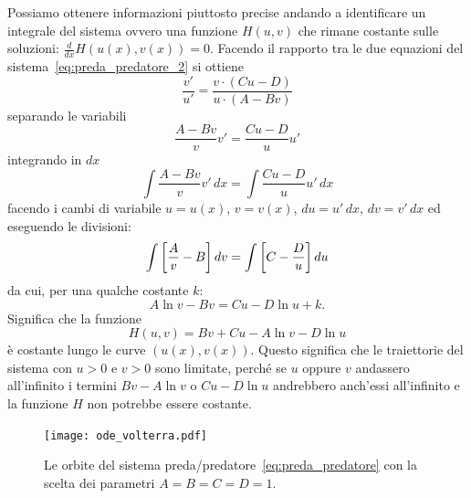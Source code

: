 Possiamo ottenere informazioni piuttosto precise andando a identificare un integrale 
del sistema ovvero una funzione $H(u,v)$ che rimane costante sulle soluzioni: 
$\frac {d}{dx} H(u(x),v(x)) = 0$. 
Facendo il rapporto tra le due equazioni del sistema~\eqref{eq:preda_predatore_2}
si ottiene 
\[
  \frac{v'}{u'} 
  = \frac{v \cdot (C u - D)}{u \cdot (A - B v)}
\]
separando le variabili
\[
  \frac{A - B v}{v} v' = \frac{C u - D}{u} u'
\]
integrando in $dx$
\[
  \int \frac{A - B v}{v} v'\, dx  = \int \frac{C u - D}{u} u'  \, dx
\]
facendo i cambi di variabile $u=u(x)$, $v=v(x)$, $du = u'\, dx$, $dv=v'\, dx$
ed eseguendo le divisioni:
\[     
  \int {\left[ \frac A v - B \right]}\, dv = \int {\left[ C  - \frac D u \right]}\, du
\]
da cui, per una qualche costante $k$:
\[
  A \ln v - B v = C u - D\ln u + k.
\]
Significa che la funzione 
\[
  H(u,v) = B v + C u - A \ln v - D \ln u
\]
è costante lungo le curve $(u(x),v(x))$.
Questo significa che le traiettorie del sistema 
con $u>0$ e $v>0$ sono limitate, perché se 
$u$ oppure $v$ andassero all'infinito 
i termini $Bv-A\ln v$ o $Cu - D \ln u$ andrebbero 
anch'essi all'infinito e la funzione $H$ non 
potrebbe essere costante.

\begin{figure}
  \begin{center}
    \texttt{[image: ode\_volterra.pdf]}
  \end{center}
  \label{fig:ode_volterra}
  \caption{
  Le orbite del sistema preda/predatore~\eqref{eq:preda_predatore} 
  con la scelta dei parametri $A=B=C=D=1$.}
\end{figure}

